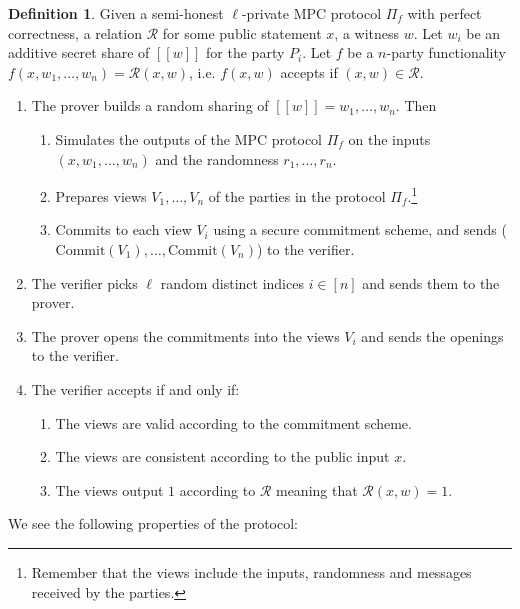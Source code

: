 \documentclass[twoside,11pt]{report}
\theoremstyle{definition}
\newtheorem{definition}{Definition}[section]
\theoremstyle{plain}
\begin{document}
\begin{definition}\label{def:mpcinth_basic}
  Given a semi-honest $\ell$-private MPC protocol $\Pi_f$ with perfect correctness, a relation $\mathcal{R}$ for some public statement $x$, a witness $w$. Let $w_i$ be an additive secret share of $[[w]]$ for the party $P_i$. Let $f$ be a $n$-party functionality $f(x, w_1, \dots, w_n) = \mathcal{R}(x, w)$, i.e. $f(x,w)$ accepts if $(x,w) \in \mathcal{R}$.

  \begin{enumerate}[parsep=2pt, itemsep=0pt]
    \item The prover builds a random sharing of $[[w]] = w_1, \dots, w_n$. Then
          \begin{enumerate}[nolistsep]
            \item Simulates the outputs of the MPC protocol $\Pi_f$ on the inputs $(x, w_1, \dots, w_n)$ and the randomness $r_1, \dots, r_n$.
            \item Prepares views $V_1, \dots, V_n$ of the parties in the protocol $\Pi_f$.\footnote{Remember that the views include the inputs, randomness and messages received by the parties.}
            \item Commits to each view $V_i$ using a secure commitment scheme, and sends ($\text{Commit}(V_1), \dots, \text{Commit}(V_n)$) to the verifier.
          \end{enumerate}
    \item The verifier picks $\ell$ random distinct indices $i \in [n]$ and sends them to the prover.
    \item The prover opens the commitments into the views $V_i$ and sends the openings to the verifier.
    \item The verifier accepts if and only if:
          \begin{enumerate}[nolistsep]
            \item\label{prop:mpcinth_commit} The views are valid according to the commitment scheme.
            \item\label{prop:mpcinth_consistent} The views are consistent according to the public input $x$.
            \item\label{prop:mpcinth_knowledge} The views output $1$ according to $\mathcal{R}$ meaning that $\mathcal{R}(x,w) = 1$.
          \end{enumerate}
  \end{enumerate}
\end{definition}

We see the following properties of the protocol:
\end{document}
